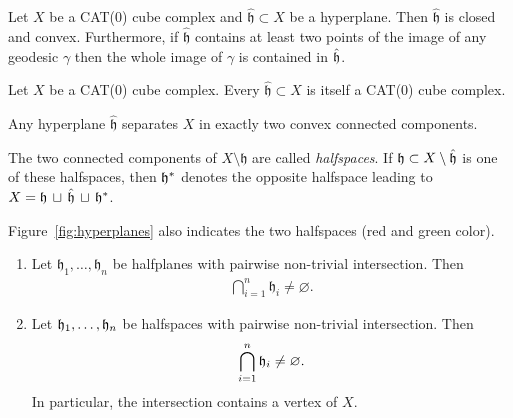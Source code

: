 \begin{prop}
  Let \(X\) be a CAT(0) cube complex and \(\mathfrak{\hat h} \subset X\) be a hyperplane. Then \(\mathfrak{\hat h}\) is closed and convex. Furthermore, if \(\mathfrak{\hat h}\) contains at least two points of the image of any geodesic \(\gamma\) then the whole image of \(\gamma\) is contained in \(\mathfrak{\hat h}\).
\end{prop}

\begin{cor}
  Let \(X\) be a CAT(0) cube complex. Every \(\mathfrak{\hat h} \subset X\) is itself a CAT(0) cube complex.
\end{cor}

\begin{thm}
  Any hyperplane \(\mathfrak{\hat h}\) separates \(X\) in exactly two convex connected components.
\end{thm}

\begin{defin}[Halfspaces]
  The two connected components of \(X \setminus \mathfrak{h}\) are called \emph{halfspaces}. If \(\mathfrak{h} \subset X \setminus \mathfrak{\hat h}\) is one of these halfspaces, then \(\mathfrak{h}^\ast\) denotes the opposite halfspace leading to \(X = \mathfrak{h}\, \sqcup\, \mathfrak{\hat h}\, \sqcup\, \mathfrak{h}^\ast \).
\end{defin}

\begin{bsp}
  Figure~\ref{fig:hyperplanes} also indicates the two halfspaces (red and green color).
\end{bsp}

\begin{thm}
  \label{thm:common-intersection}
  \begin{enumerate}
  \item Let \(\mathfrak{h}_1, \dots, \mathfrak{h}_n\) be halfplanes with pairwise non-trivial intersection. Then
    \begin{align*}
      \bigcap_{i=1}^n \mathfrak{h}_i \neq \varnothing.
    \end{align*}
  \item Let \(\mathfrak{h}_1, \dots, \mathfrak{h}_n\) be halfspaces with pairwise non-trivial intersection. Then
    \begin{align*}
      \bigcap_{i=1}^n \mathfrak{h}_i \neq \varnothing.
    \end{align*}
    In particular, the intersection contains a vertex of \(X\).
  \end{enumerate}
\end{thm}

